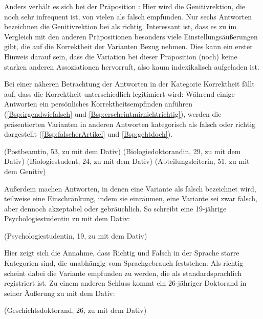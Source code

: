 Anders verhält es sich bei der Präposition \gegenueber{}: 
Hier wird die Genitivrektion, die noch sehr infrequent ist, von vielen als falsch empfunden.
Nur sechs Antworten bezeichnen die Genitivrektion bei \gegenueber{} als richtig. 
Interessant ist, dass es zu \gegenueber{} im Vergleich mit den anderen Präpositionen besonders viele Einstellungsäußerungen gibt, die auf die Korrektheit der Varianten Bezug nehmen. 
Dies kann ein erster Hinweis darauf sein, dass die Variation bei dieser Präposition (noch) keine starken anderen Assoziationen hervorruft, also kaum indexikalisch aufgeladen ist. 

Bei einer näheren Betrachtung der Antworten in der Kategorie \glqq Korrektheit\grqq{} fällt auf, dass die Korrektheit unterschiedlich legitimiert wird: 
Während einige Antworten ein persönliches Korrektheitsempfinden anführen (\autoref{Bsp:irgendwiefalsch} und \autoref{Bsp:erscheintmirnichtrichtig}), werden die präsentierten Varianten in anderen Antworten kategorisch als falsch oder richtig dargestellt (\autoref{Bsp:falscherArtikel} und \autoref{Bsp:gehtdoch}). 
\begin{exe}
\ex {} (Postbeamtin, 53, zu \dank{} mit dem Dativ) \label{Bsp:irgendwiefalsch}
\ex {} (Biologiedoktorandin, 29, zu \dank{} mit dem Dativ) \label{Bsp:erscheintmirnichtrichtig}
\ex {} (Biologiestudent, 24, zu \dank{} mit dem Dativ) \label{Bsp:falscherArtikel}
\ex {} (Abteilungsleiterin, 51, zu \dank{} mit dem Genitiv) \label{Bsp:gehtdoch}
\end{exe}
Außerdem machen Antworten, in denen eine Variante als falsch bezeichnet wird, teilweise eine Einschränkung, indem sie einräumen, eine Variante sei zwar falsch, aber dennoch akzeptabel oder gebräuchlich.
So schreibt eine 19-jährige Psychologiestudentin zu \waehrend{} mit dem Dativ:
\begin{exe}
\ex {} (Psychologiestudentin, 19, zu \waehrend{} mit dem Dativ) \label{Bsp:falschumgangssprachlich}
\end{exe}
Hier zeigt sich die Annahme, dass Richtig und Falsch in der Sprache starre Kategorien sind, die unabhängig vom Sprachgebrauch feststehen. 
Als richtig scheint dabei die Variante empfunden zu werden, die als standardsprachlich registriert ist. 
Zu einem anderen Schluss kommt ein 26-jähriger Doktorand in seiner Äußerung zu \dank{} mit dem Dativ: 
\begin{exe}
\ex {} (Geschichtsdoktorand, 26, zu \dank{} mit dem Dativ)
\end{exe}

